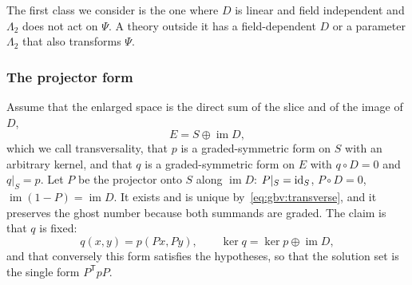 The first class we consider is the one where $D$ is linear and field independent and $\Lambda_2$ does not act on $\Psi$.
A theory outside it has a field-dependent $D$ or a parameter $\Lambda_2$ that also transforms $\Psi$.

\subsubsection{The projector form}
\label{sec:gauge-bv:projector}


Assume that the enlarged space is the direct sum of the slice and of the image of $D$,
\begin{equation}
  \label{eq:gbv:transverse}
  E
    = S \oplus \operatorname{im} D,
\end{equation}
which we call transversality, that $p$ is a graded-symmetric form on $S$ with an arbitrary kernel, and that $q$ is a graded-symmetric form on $E$ with $q \circ D = 0$ and $q|_S = p$.
Let $P$ be the projector onto $S$ along $\operatorname{im} D$: $P|_S = \mathrm{id}_S$, $P \circ D = 0$, $\operatorname{im}(1 - P) = \operatorname{im} D$.
It exists and is unique by~\eqref{eq:gbv:transverse}, and it preserves the ghost number because both summands are graded.
The claim is that $q$ is fixed:
\begin{equation}
  \label{eq:gbv:projector-form}
  q(x, y)
    = p(P x, P y),
  \qquad
  \ker q
    = \ker p \oplus \operatorname{im} D,
\end{equation}
and that conversely this form satisfies the hypotheses, so that the solution set is the single form $P^{\mathsf T} p P$.

